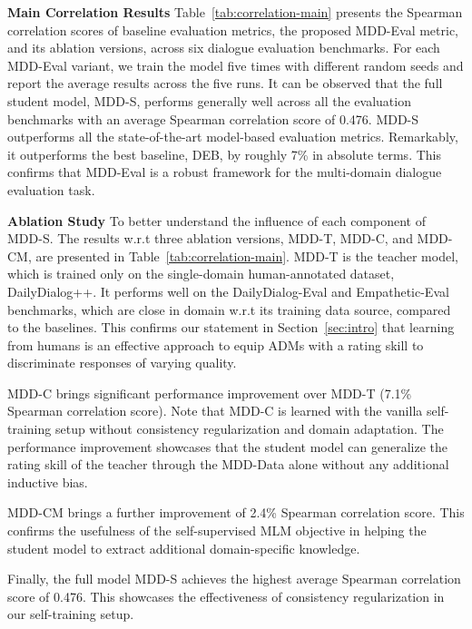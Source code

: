 \documentclass[letterpaper]{article} \usepackage{aaai22}  \usepackage{times}  \usepackage{helvet}  \usepackage{courier}  \usepackage[hyphens]{url}  \usepackage{graphicx} \urlstyle{rm} \def\UrlFont{\rm}  \usepackage{natbib}  \usepackage{caption} \DeclareCaptionStyle{ruled}{labelfont=normalfont,labelsep=colon,strut=off} \frenchspacing  \setlength{\pdfpagewidth}{8.5in}  \setlength{\pdfpageheight}{11in}  \usepackage{algorithm}
\begin{document}
\bigskip
\noindent\textbf{Main Correlation Results}
\text{ } Table~\ref{tab:correlation-main} presents the Spearman correlation scores of baseline evaluation metrics, the proposed MDD-Eval metric, and its ablation versions, across six dialogue evaluation benchmarks. For each MDD-Eval variant, we train the model five times with different random seeds and report the average results across the five runs. It can be observed that the full student model, MDD-S, performs generally well across all the evaluation benchmarks with an average Spearman correlation score of 0.476. MDD-S outperforms all the state-of-the-art model-based evaluation metrics. Remarkably, it outperforms the best baseline, DEB, by roughly 7\% in absolute terms. This confirms that MDD-Eval is a robust framework for the multi-domain dialogue evaluation task.

\bigskip
\noindent\textbf{Ablation Study}
\text{ } To better understand the influence of each component of MDD-S. The results w.r.t three ablation versions, MDD-T, MDD-C, and MDD-CM, are presented in Table~\ref{tab:correlation-main}. MDD-T is the teacher model, which is trained only on the single-domain human-annotated dataset, DailyDialog++. It performs well on the DailyDialog-Eval and Empathetic-Eval benchmarks,  which are close in domain w.r.t its training data source, compared to the baselines. This confirms our statement in Section~\ref{sec:intro} that learning from humans is an effective approach to equip ADMs with a rating skill to discriminate responses of varying quality.

MDD-C brings significant performance improvement over MDD-T (7.1\% Spearman correlation score). Note that MDD-C is learned with the vanilla self-training setup without consistency regularization and domain adaptation. The performance improvement showcases that the student model can generalize the rating skill of the teacher through the MDD-Data alone without any additional inductive bias.

MDD-CM brings a further improvement of 2.4\% Spearman correlation score. This confirms the usefulness of the self-supervised MLM objective in helping the student model to extract additional domain-specific knowledge. 

Finally, the full model MDD-S achieves the highest average Spearman correlation score of 0.476. This showcases the effectiveness of consistency regularization in our self-training setup.
\end{document}
